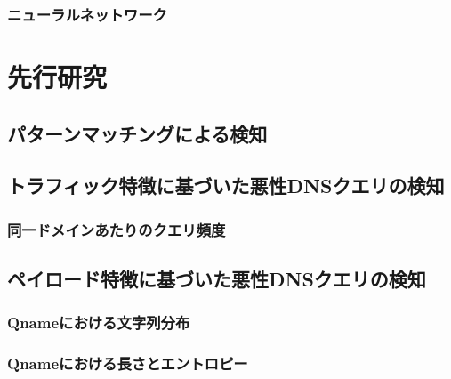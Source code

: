 \documentclass[12pt]{jarticle} %
\begin{document}
\subsubsection{ニューラルネットワーク}


\newpage
\section{先行研究}
\subsection{パターンマッチングによる検知}
\subsection{トラフィック特徴に基づいた悪性DNSクエリの検知}
\subsubsection{同一ドメインあたりのクエリ頻度}
\subsection{ペイロード特徴に基づいた悪性DNSクエリの検知}
\subsubsection{Qnameにおける文字列分布}
\subsubsection{Qnameにおける長さとエントロピー}
\end{document}
